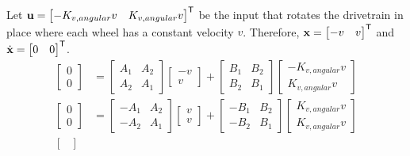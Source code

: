 Let $\mathbf{u} =
\begin{bmatrix}
  -K_{v,angular} v & K_{v,angular} v
\end{bmatrix}^\mathsf{T}$ be the input that rotates the drivetrain in place where each
wheel has a constant velocity $v$. Therefore, $\mathbf{x} =
\begin{bmatrix}
  -v & v
\end{bmatrix}^\mathsf{T}$ and $\dot{\mathbf{x}} =
\begin{bmatrix}
  0 & 0
\end{bmatrix}^\mathsf{T}$.
\begin{align*}
  \begin{bmatrix}
    0 \\
    0
  \end{bmatrix} &=
    \begin{bmatrix}
      A_1 & A_2 \\
      A_2 & A_1
    \end{bmatrix}
    \begin{bmatrix}
      -v \\
      v
    \end{bmatrix} +
    \begin{bmatrix}
      B_1 & B_2 \\
      B_2 & B_1
    \end{bmatrix}
    \begin{bmatrix}
      -K_{v,angular} v \\
      K_{v,angular} v
    \end{bmatrix} \\
  \begin{bmatrix}
    0 \\
    0
  \end{bmatrix} &=
    \begin{bmatrix}
      -A_1 & A_2 \\
      -A_2 & A_1
    \end{bmatrix}
    \begin{bmatrix}
      v \\
      v
    \end{bmatrix} +
    \begin{bmatrix}
      -B_1 & B_2 \\
      -B_2 & B_1
    \end{bmatrix}
    \begin{bmatrix}
      K_{v,angular} v \\
      K_{v,angular} v
    \end{bmatrix} \\
  \begin{bmatrix}

\end{bmatrix}
\end{align*}
